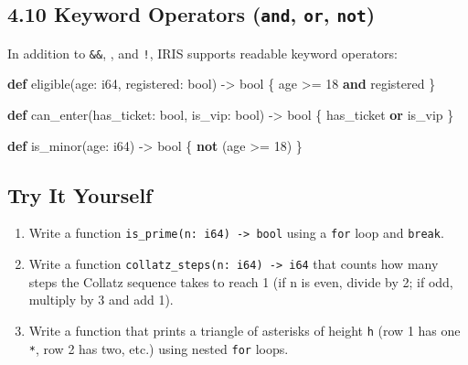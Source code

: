 \documentclass[
  english,
]{book}
\newenvironment{Shaded}{\begin{snugshade}}{\end{snugshade}}
\newcommand{\DataTypeTok}[1]{\textcolor[rgb]{0.31,0.79,0.69}{#1}}
\newcommand{\DecValTok}[1]{\textcolor[rgb]{0.71,0.81,0.66}{#1}}
\newcommand{\KeywordTok}[1]{\textcolor[rgb]{0.34,0.61,0.84}{\textbf{#1}}}
\newcommand{\NormalTok}[1]{\textcolor[rgb]{0.83,0.83,0.83}{#1}}
\newcommand{\OperatorTok}[1]{\textcolor[rgb]{0.83,0.83,0.83}{#1}}
\providecommand{\tightlist}{%
  \setlength{\itemsep}{0pt}\setlength{\parskip}{0pt}}
\begin{document}
\subsection{\texorpdfstring{4.10 Keyword Operators (\texttt{and},
\texttt{or},
\texttt{not})}{4.10 Keyword Operators (and, or, not)}}\label{keyword-operators-and-or-not-1}

In addition to \texttt{\&\&}, \texttt{\textbar{}\textbar{}}, and
\texttt{!}, IRIS supports readable keyword operators:

\begin{Shaded}
\begin{Highlighting}[]
\KeywordTok{def}\NormalTok{ eligible(age: }\DataTypeTok{i64}\NormalTok{, registered: }\DataTypeTok{bool}\NormalTok{) }\OperatorTok{{-}\textgreater{}} \DataTypeTok{bool}\NormalTok{ \{}
\NormalTok{    age }\OperatorTok{\textgreater{}=} \DecValTok{18} \KeywordTok{and}\NormalTok{ registered}
\NormalTok{\}}

\KeywordTok{def}\NormalTok{ can\_enter(has\_ticket: }\DataTypeTok{bool}\NormalTok{, is\_vip: }\DataTypeTok{bool}\NormalTok{) }\OperatorTok{{-}\textgreater{}} \DataTypeTok{bool}\NormalTok{ \{}
\NormalTok{    has\_ticket }\KeywordTok{or}\NormalTok{ is\_vip}
\NormalTok{\}}

\KeywordTok{def}\NormalTok{ is\_minor(age: }\DataTypeTok{i64}\NormalTok{) }\OperatorTok{{-}\textgreater{}} \DataTypeTok{bool}\NormalTok{ \{}
    \KeywordTok{not}\NormalTok{ (age }\OperatorTok{\textgreater{}=} \DecValTok{18}\NormalTok{)}
\NormalTok{\}}
\end{Highlighting}
\end{Shaded}

\subsection{Try It Yourself}\label{try-it-yourself-3}

\begin{enumerate}
\def\labelenumi{\arabic{enumi}.}
\tightlist
\item
  Write a function \texttt{is\_prime(n:\ i64)\ -\textgreater{}\ bool}
  using a \texttt{for} loop and \texttt{break}.
\item
  Write a function
  \texttt{collatz\_steps(n:\ i64)\ -\textgreater{}\ i64} that counts how
  many steps the Collatz sequence takes to reach 1 (if n is even, divide
  by 2; if odd, multiply by 3 and add 1).
\item
  Write a function that prints a triangle of asterisks of height
  \texttt{h} (row 1 has one \texttt{*}, row 2 has two, etc.) using
  nested \texttt{for} loops.
\end{enumerate}
\end{document}
